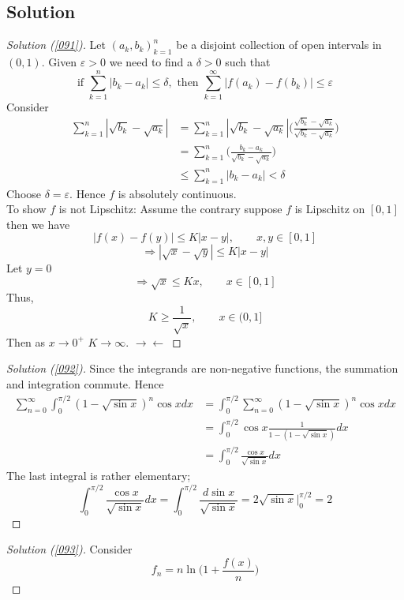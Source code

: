 \documentclass[	DIV=calc,paper=a4,fontsize=11pt]{scrartcl}	 	%
\theoremstyle{definition}
\theoremstyle{plain}
\theoremstyle{remark}
\begin{document}
\subsection*{Solution}
\begin{proof}[Solution (\ref{091})]
Let ${(a_k,b_k)}_{k=1}^{n}$ be a disjoint collection of open intervals in $(0,1)$. Given $\varepsilon>0$ we need to find a $\delta>0$ such that
\[\text{if } \sum_{k=1}^{n}|b_k-a_k|\le \delta,\text{ then } \sum_{k=1}^{\infty}|f(a_k)-f(b_k)|\le\varepsilon\]
Consider
\begin{align*}
\sum_{k=1}^{n}|\sqrt{b_k}-\sqrt{a_k}|&=\sum_{k=1}^{n}|\sqrt{b_k}-\sqrt{a_k}|\biggl(\frac{\sqrt{b_k}-\sqrt{a_k}}{\sqrt{b_k}-\sqrt{a_k}}\biggl)\\
                                          &=\sum_{k=1}^{n}\biggl(\frac{b_k-a_k}{\sqrt{b_k}-\sqrt{a_k}}\biggl)\\
                                          &\le \sum_{k=1}^{n}|b_k-a_k|<\delta
\end{align*}
Choose $\delta=\varepsilon$. Hence $f$ is absolutely continuous.\\
To show $f$ is not Lipschitz: Assume the contrary suppose $f$ is Lipschitz on $[0,1]$ then we have
\[|f(x)-f(y)|\le K|x-y|,\qquad x,y\in[0,1] \]
\[\Rightarrow |\sqrt{x}-\sqrt{y}|\le K|x-y|\]
Let $y=0$
\[\Rightarrow \sqrt{x}\le Kx,\qquad x\in[0,1] \]
Thus,
\[K\ge \frac{1}{\sqrt{x}},\qquad x\in(0,1] \]
Then as $x\to 0^+$ $K\to \infty$. $\rightarrow\leftarrow$
\end{proof}
\begin{proof}[Solution (\ref{092})]
Since the integrands are non-negative functions, the summation and integration commute. Hence
\begin{align*}
\sum_{n=0}^{\infty}\int_{0}^{\pi/2}(1-\sqrt{\sin x})^n\cos xdx&=\int_{0}^{\pi/2}\sum_{n=0}^{\infty}(1-\sqrt{\sin x})^n\cos xdx\\
&=\int_{0}^{\pi/2}\cos x\frac{1}{1-(1-\sqrt{\sin x})}dx\\                                                       &=\int_{0}^{\pi/2}\frac{\cos x}{\sqrt{\sin x}}dx
\end{align*}
The last integral is rather elementary;
\[\int_{0}^{\pi/2}\frac{\cos x}{\sqrt{\sin x}}dx=\int_{0}^{\pi/2}\frac{d\sin x}{\sqrt{\sin x}}=2\sqrt{\sin x}\biggl|_0^{\pi/2}=2\]
\end{proof}
\begin{proof}[Solution (\ref{093})]
Consider
\[f_n=n\ln\biggl(1+\frac{f(x)}{n}\biggl)\]
\end{proof}
\end{document}

